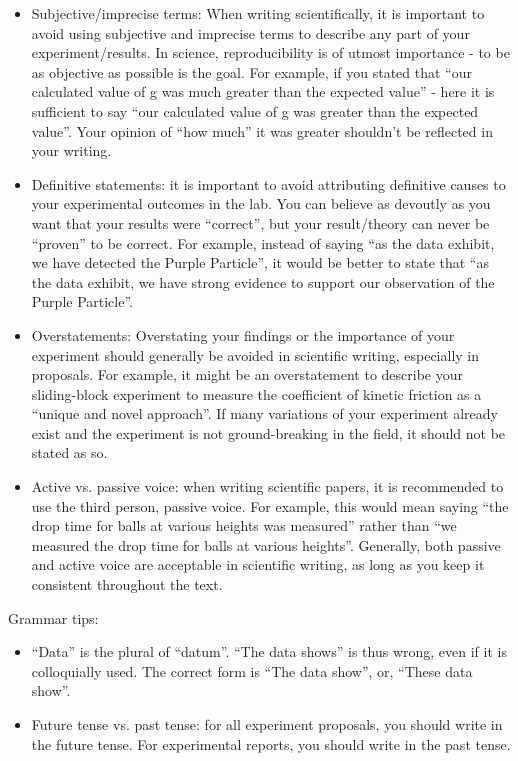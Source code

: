 \begin{itemize}
\item Subjective/imprecise terms: When writing scientifically, it is important to avoid using subjective and imprecise terms to describe any part of your experiment/results. In science, reproducibility is of utmost importance - to be as objective as possible is the goal. For example, if you stated that ``our calculated value of g was much greater than the expected value'' - here it is sufficient to say ``our calculated value of g was greater than the expected value''. Your opinion of ``how much'' it was greater shouldn't be reflected in your writing.
\item Definitive statements: it is important to avoid attributing definitive causes to your experimental outcomes in the lab. You can believe as devoutly as you want that your results were ``correct'', but your result/theory can never be ``proven'' to be correct. For example, instead of saying ``as the data exhibit, we have detected the Purple Particle'', it would be better to state that ``as the data exhibit, we have strong evidence to support our observation of the Purple Particle''. 
\item Overstatements: Overstating your findings or the importance of your experiment should generally be avoided in scientific writing, especially in proposals. For example, it might be an overstatement to describe your sliding-block experiment to measure the coefficient of kinetic friction as a ``unique and novel approach''. If many variations of your experiment already exist and the experiment is not ground-breaking in the field, it should not be stated as so.
\item Active vs. passive voice: when writing scientific papers, it is recommended to use the third person, passive voice. For example, this would mean saying ``the drop time for balls at various heights was measured'' rather than ``we measured the drop time for balls at various heights''. Generally, both passive and active voice are acceptable in scientific writing, as long as you keep it consistent throughout the text.
\end{itemize}

Grammar tips: %
\begin{itemize}
\item ``Data'' is the plural of ``datum''. ``The data shows'' is thus wrong, even if it is colloquially used. The correct form is ``The data show'', or, ``These data show''.
\item Future tense vs. past tense: for all experiment proposals, you should write in the future tense. For experimental reports, you should write in the past tense. 
\end{itemize}

